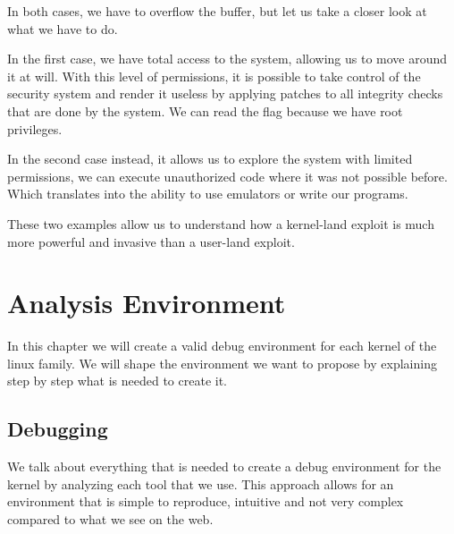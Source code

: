 \documentclass{masterthesis}
\newcommand{\vtnote}[1]{\todo[color=green!20]{#1}}
\begin{document}
In both cases, we have to overflow the buffer, but let us take a closer look at what we have to do.

In the first case, we have total access to the system, allowing us to move around it at will.
With this level of permissions, it is possible to take control of the security system and render it useless by applying patches to all integrity checks that are done by the system.
We can read the flag because we have root privileges.

In the second case instead, it allows us to explore the system with limited permissions, we can execute unauthorized code where it was not possible before. Which translates into the ability to use emulators or write our programs.

These two examples allow us to understand how a kernel-land exploit is much more powerful and invasive than a user-land exploit.


\chapter{Analysis Environment}
\label{ch:analyze}\vtnote{aggiunto}
In this chapter we will create a valid debug environment for each kernel of the linux family.
We will shape the environment we want to propose by explaining step by step what is needed to create it.
\section{Debugging}
\label{sect:debugging}\vtnote{aggiunto}
We talk about everything that is needed to create a debug environment for the kernel by analyzing each tool that we use.
This approach allows for an environment that is simple to reproduce, intuitive and not very complex compared to what we see on the web.
\end{document}
